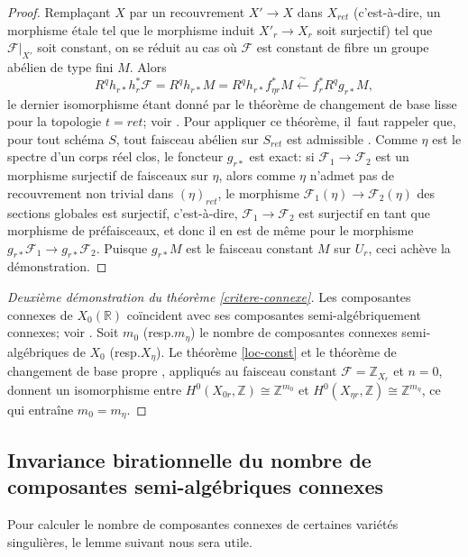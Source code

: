 \documentclass[11pt]{article}
\newcommand{\resp}{resp.\xspace}
\newcommand{\isofrom}{\stackrel{\sim}{\longleftarrow}}
\theoremstyle{definition}
\newcommand{\Z}{\mathbb Z}
\newcommand{\R}{\mathbb R}
\newcommand{\mc}[1]{\mathcal{#1}}
\begin{document}
\begin{proof}
Remplaçant $X$ par un recouvrement $X'\to X$ dans $X_{ret}$ (c'est-à-dire, un morphisme étale tel que le morphisme induit $X'_r\to X_r$ soit surjectif) tel que $\mc{F}|_{X'}$ soit constant, on se réduit au cas où $\mc{F}$ est constant de fibre un groupe abélien de type fini $M$. Alors\vspace*{-3pt}
\[ R^q h_{r*} h_r^* \mc{F} = R^q h_{r*} M = R^q h_{r*}f_{\eta r}^* M \isofrom f_r^* R^q g_{r*} M, \]
le dernier isomorphisme étant donné par le théorème de changement de base lisse pour la topologie $t=ret$; voir
\cite[Th.\,16.11]{scheiderer1994real}. Pour appliquer ce théorème, il~faut rappeler que, pour tout schéma $S$, tout faisceau abélien sur $S_{ret}$ est admissible \cite[Def.\,16.4.1(a)]{scheiderer1994real}. Comme $\eta$ est le spectre d'un corps réel clos, le foncteur $g_{r*}$ est exact: si $\mc{F}_1\to \mc{F}_2$ est un morphisme surjectif de faisceaux sur $\eta$, alors comme $\eta$ n'admet pas de recouvrement non trivial dans $(\eta)_{ret}$, le morphisme $\mc{F}_1(\eta)\to \mc{F}_2(\eta)$ des sections globales est surjectif, c'est-à-dire, $\mc{F}_1\to \mc{F}_2$ est surjectif en tant que morphisme de préfaisceaux, et donc il en est de même pour le morphisme $g_{r*}\mc{F}_1\to g_{r*} \mc{F}_2$. Puisque $g_{r*}M$ est le faisceau constant $M$ sur $U_r$, ceci achève la démonstration.
\end{proof}

\begin{proof}[Deuxième démonstration du théorème \ref{critere-connexe}]
Les composantes connexes de $X_0(\R)$ coïncident avec ses composantes semi-algébriquement connexes; voir \cite[Th.\,2.4.5]{bochnak1987geometrie}. Soit $m_0$ (\resp $m_\eta$) le nombre de composantes connexes semi-algébriques de $X_0$ (\resp $X_\eta$). Le théorème \ref{loc-const} et le théorème de changement de base propre \cite[Th.\,16.2 ($t=ret$)]{scheiderer1994real}, appliqués au faisceau constant $\mc{F}=\Z_{X_r}$ et $n=0$, donnent un isomorphisme entre $H^0(X_{0r},\Z)\cong \Z^{m_0}$ et $H^0(X_{\eta r},\Z)\cong\Z^{m_\eta}$, ce qui entraîne $m_0=m_\eta$.
\end{proof}

\subsection{Invariance birationnelle du nombre de composantes semi-algébriques connexes} Pour calculer le nombre de composantes connexes de certaines variétés singulières, le lemme suivant nous sera utile.
\end{document}
